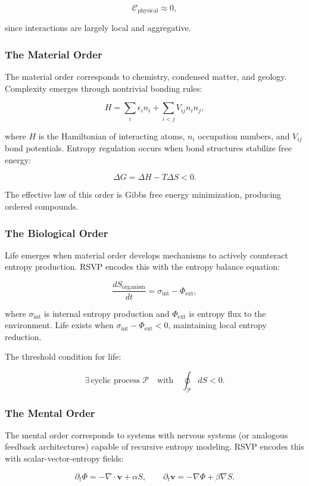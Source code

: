 \documentclass[12pt]{book}
\begin{document}
\[ \mathcal{C}_{\text{physical}} \approx 0, \]

since interactions are largely local and aggregative.

\subsubsection{The Material Order}
The material order corresponds to chemistry, condensed matter, and geology. Complexity emerges through nontrivial bonding rules:

\[ H = \sum_i \epsilon_i n_i + \sum_{i<j} V_{ij} n_i n_j, \]

where \( H \) is the Hamiltonian of interacting atoms, \( n_i \) occupation numbers, and \( V_{ij} \) bond potentials. Entropy regulation occurs when bond structures stabilize free energy:

\[ \Delta G = \Delta H - T \Delta S < 0. \]

The effective law of this order is Gibbs free energy minimization, producing ordered compounds.

\subsubsection{The Biological Order}
Life emerges when material order develops mechanisms to actively counteract entropy production. RSVP encodes this with the entropy balance equation:

\[ \frac{dS_{\text{organism}}}{dt} = \sigma_{\text{int}} - \Phi_{\text{ext}}, \]

where \( \sigma_{\text{int}} \) is internal entropy production and \( \Phi_{\text{ext}} \) is entropy flux to the environment. Life exists when \( \sigma_{\text{int}} - \Phi_{\text{ext}} < 0 \), maintaining local entropy reduction.

The threshold condition for life:

\[ \exists \, \text{cyclic process } \mathcal{P} \quad \text{with} \quad \oint_{\mathcal{P}} dS < 0. \]

\subsubsection{The Mental Order}
The mental order corresponds to systems with nervous systems (or analogous feedback architectures) capable of recursive entropy modeling. RSVP encodes this with scalar-vector-entropy fields:

\[ \partial_t \Phi = - \nabla \cdot \mathbf{v} + \alpha S, \qquad 
\partial_t \mathbf{v} = -\nabla \Phi + \beta \nabla S. \]
\end{document}
